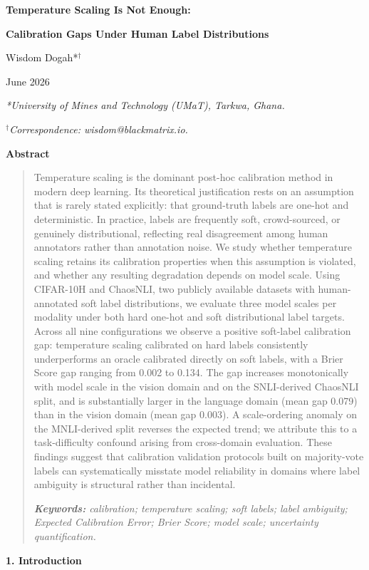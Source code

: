 \documentclass[11pt]{article}
\begin{document}
\textbf{Temperature Scaling Is Not Enough:}

\textbf{Calibration Gaps Under Human Label Distributions}

Wisdom Dogah*$^\dagger$

June 2026

\emph{*University of Mines and Technology (UMaT), Tarkwa, Ghana.}

\emph{$^\dagger$Correspondence: wisdom@blackmatrix.io.}

\textbf{Abstract}

\begin{quote}
Temperature scaling is the dominant post-hoc calibration method in
modern deep learning. Its theoretical justification rests on an
assumption that is rarely stated explicitly: that ground-truth labels
are one-hot and deterministic. In practice, labels are frequently soft,
crowd-sourced, or genuinely distributional, reflecting real disagreement
among human annotators rather than annotation noise. We study whether
temperature scaling retains its calibration properties when this
assumption is violated, and whether any resulting degradation depends on
model scale. Using CIFAR-10H and ChaosNLI, two publicly available
datasets with human-annotated soft label distributions, we evaluate
three model scales per modality under both hard one-hot and soft
distributional label targets. Across all nine configurations we observe
a positive soft-label calibration gap: temperature scaling calibrated on
hard labels consistently underperforms an oracle calibrated directly on
soft labels, with a Brier Score gap ranging from 0.002 to 0.134. The gap
increases monotonically with model scale in the vision domain and on the
SNLI-derived ChaosNLI split, and is substantially larger in the language
domain (mean gap 0.079) than in the vision domain (mean gap 0.003). A
scale-ordering anomaly on the MNLI-derived split reverses the expected
trend; we attribute this to a task-difficulty confound arising from
cross-domain evaluation. These findings suggest that calibration
validation protocols built on majority-vote labels can systematically
misstate model reliability in domains where label ambiguity is
structural rather than incidental.

\emph{\textbf{Keywords:} calibration; temperature scaling; soft labels;
label ambiguity; Expected Calibration Error; Brier Score; model scale;
uncertainty quantification.}
\end{quote}

\textbf{1. Introduction}
\end{document}
